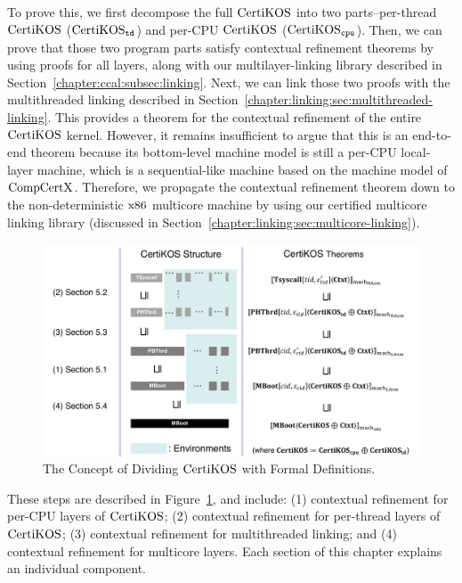 To  prove this, we first decompose the full $\mathrm{CertiKOS}$ into two parts--per-thread $\mathrm{CertiKOS}$ ($\mathrm{CertiKOS}_{{\mathrm{\texttt{td}}}}$) and per-CPU $\mathrm{CertiKOS}$ ($\mathrm{CertiKOS}_{{\mathrm{\texttt{cpu}}}}$).
Then, we can prove that those two program parts satisfy contextual refinement theorems by using proofs for all layers,
along with our multilayer-linking library described in Section~\ref{chapter:ccal:subsec:linking}. 
Next, we can link those two proofs with the multithreaded linking described in Section~\ref{chapter:linking:sec:multithreaded-linking}. 
This provides a theorem for the contextual refinement of the entire $\mathrm{CertiKOS}$ kernel. 
However, it remains insufficient to argue that this is an end-to-end theorem because its bottom-level machine model is still a per-CPU local-layer machine, which is a sequential-like machine based on the machine model of $\mathrm{CompCertX}$. 
Therefore, we propagate the contextual refinement theorem down to the non-deterministic $\mathrm{x86}$ multicore machine by using our certified multicore linking library (discussed in Section~\ref{chapter:linking:sec:multicore-linking}).
\begin{figure}
\includegraphics[width=\textwidth, page=1]{figs/certikos/concurrent_linking}
\caption{The Concept of Dividing $\mathrm{CertiKOS}$ with Formal Definitions.} 
\label{fig:chapter:certikos:idea-of-dividing-certikos-with-formal-def}
\end{figure}
These steps are described in Figure~\ref{fig:chapter:certikos:idea-of-dividing-certikos-with-formal-def}, and include: 
(1) contextual refinement for per-CPU layers of $\mathrm{CertiKOS}$; 
(2) contextual refinement for per-thread layers of $\mathrm{CertiKOS}$; 
(3) contextual refinement for multithreaded linking; and 
(4) contextual refinement for multicore layers. Each section of this chapter explains an individual component.
